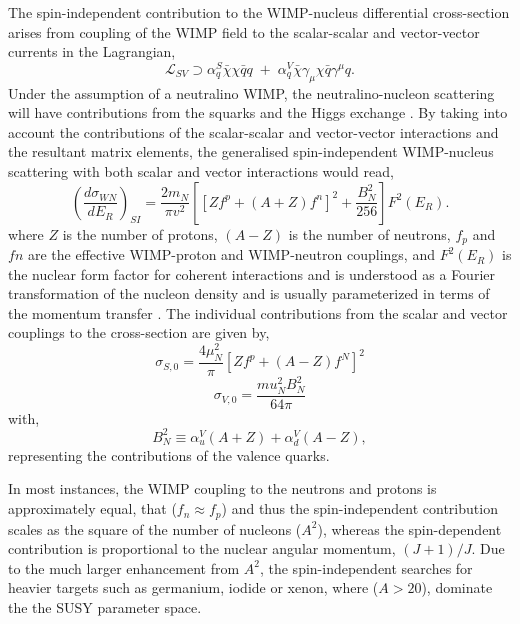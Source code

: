 {The spin-independent contribution to the WIMP-nucleus differential cross-section arises from coupling of the WIMP field to the scalar-scalar and vector-vector currents in the Lagrangian,
%
\begin{equation} \label{eq:scalar_vector_lag}
   \mathcal{L}_{SV} \supset \alpha^{S}_{q} \bar{\chi} \chi \bar{q}q \; + \; \alpha^{V}_{q} \bar{\chi} \gamma_{\mu} \chi \bar{q} \gamma^{\mu}q.
\end{equation}
%
Under the assumption of a neutralino WIMP, the neutralino-nucleon scattering will have contributions from the squarks and the Higgs exchange \cite{Jungman_1996}. By taking into account the contributions of the scalar-scalar and vector-vector interactions and the resultant matrix elements, the generalised spin-independent WIMP-nucleus scattering with both scalar and vector interactions would read,
%
\begin{equation} \label{eq:si_rate}
   	\left(\frac{d\sigma_{WN}}{dE_{R}}\right)_{SI} = \frac{2m_{N}}{\pi{}v^{2}}\left[[Zf^{p} + (A + Z)f^{n}]^2 + \frac{B^{2}_{N}}{256}\right] F^{2}(E_{R}).
\end{equation}
%
where $Z$ is the number of protons, $(A-Z)$ is the number of neutrons, $f_{p}$ and $f{n}$ are the effective WIMP-proton and WIMP-neutron couplings, and $F^2(E_{R})$ is the nuclear form factor for coherent interactions and is understood as a Fourier transformation of the nucleon density and is usually parameterized in terms of the momentum transfer \cite{nuclear_form_wimp}. The individual contributions from the scalar and vector couplings to the cross-section are given by,
%
\begin{equation} \label{eq:scalar_vector_contributions}
   	\sigma_{S,0} = \frac{4\mu^{2}_{N}}{\pi}[Zf^{p} + (A-Z)f^{N}]^2
\end{equation}
%
%
\begin{equation} \label{eq:scalar_vector_contributions}
   	\sigma_{V,0} = \frac{mu^{2}_{N}B^{2}_{N}}{64\pi}
\end{equation}
%
with,
%
\begin{equation} \label{eq:scalar_vector_contributions}
   	B^{2}_{N} \equiv \alpha^{V}_{u}(A+Z) + \alpha^{V}_{d}(A-Z),
\end{equation}
%
representing the contributions of the valence quarks.

In most instances, the WIMP coupling to the neutrons and protons is approximately equal, that ($f_{n} \approx f_{p}$) and thus the spin-independent contribution scales as the square of the number of nucleons ($A^2$), whereas the spin-dependent contribution is proportional to the nuclear angular momentum, $(J+1)/J$. Due to the much larger enhancement from $A^2$, the spin-independent searches for heavier targets such as germanium, iodide or xenon, where ($A>20$), dominate the the SUSY parameter space.

}
